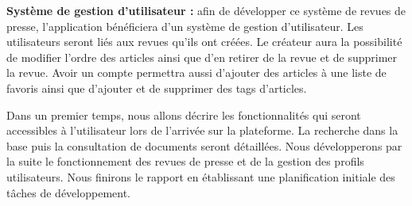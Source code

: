 		\textbf{Système de gestion d'utilisateur :} afin de développer ce système de revues de presse, l’application bénéficiera d’un système de gestion d’utilisateur. Les utilisateurs seront liés aux revues qu’ils ont créées. Le créateur aura la possibilité de modifier l'ordre des articles ainsi que d'en retirer de la revue et de supprimer la revue. Avoir un compte permettra aussi d'ajouter des articles à une liste de favoris ainsi que d'ajouter et de supprimer des tags d'articles.

    Dans un premier temps, nous allons décrire les fonctionnalités qui seront accessibles à l'utilisateur lors de l'arrivée sur la plateforme. La recherche dans la base puis la consultation de documents seront détaillées. Nous développerons par la suite le fonctionnement des revues de presse et de la gestion des profils utilisateurs. Nous finirons le rapport en établissant une planification initiale des tâches de développement.